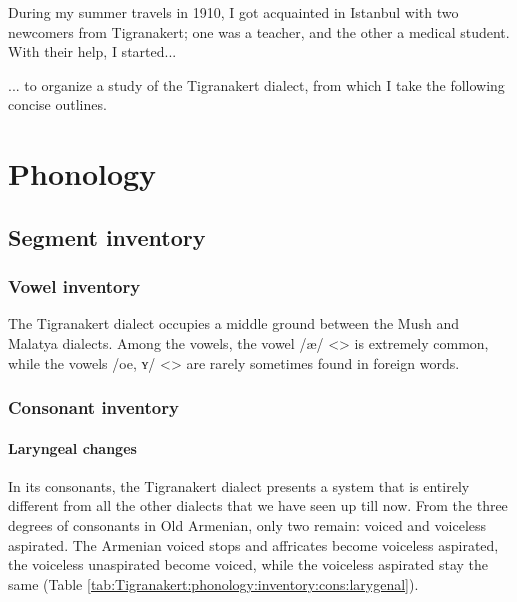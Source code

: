During my summer travels in 1910, I got acquainted in Istanbul with two newcomers from Tigranakert; one was a teacher, and the other a medical student. With their help, I started... 

\begin{adjarianpage}\label{page:160}\end{adjarianpage}%

... to organize a study of the Tigranakert dialect, from which I take the following concise outlines. 


\section{Phonology}

\subsection{Segment inventory}

\subsubsection{Vowel inventory}

The Tigranakert dialect occupies a middle ground between the Mush and Malatya dialects. Among the vowels, the vowel /æ/ <> is extremely common, while the vowels /oe, ʏ/ <> are rarely sometimes found in foreign words. 

\subsubsection{Consonant inventory}

\paragraph{Laryngeal changes}
In its consonants, the Tigranakert dialect presents a system that is entirely different from all the other dialects that we have seen up till now. From the three degrees of consonants in Old Armenian, only two remain: voiced and voiceless aspirated. The Armenian voiced stops and affricates become voiceless aspirated, the voiceless unaspirated become voiced, while the voiceless aspirated stay the same (Table \ref{tab:Tigranakert:phonology:inventory:cons:larygenal}). 



